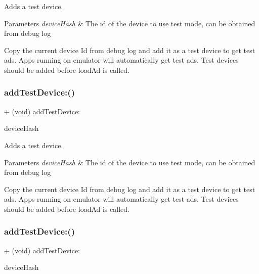 Adds a test device.


\begin{DoxyParams}{Parameters}
{\em device\+Hash} & The id of the device to use test mode, can be obtained from debug log\\
\hline
\end{DoxyParams}
Copy the current device Id from debug log and add it as a test device to get test ads. Apps running on emulator will automatically get test ads. Test devices should be added before load\+Ad is called. \mbox{\label{interfaceFBAdSettings_adf2fc44110adb3613551750bf42671af}} 
\subsubsection{\texorpdfstring{add\+Test\+Device\+:()}{addTestDevice:()}\hspace{0.1cm}{\footnotesize\ttfamily [2/5]}}
{\footnotesize\ttfamily + (void) add\+Test\+Device\+: \begin{DoxyParamCaption}\item[{(N\+S\+String $\ast$)}]{device\+Hash }\end{DoxyParamCaption}}

Adds a test device.


\begin{DoxyParams}{Parameters}
{\em device\+Hash} & The id of the device to use test mode, can be obtained from debug log\\
\hline
\end{DoxyParams}
Copy the current device Id from debug log and add it as a test device to get test ads. Apps running on emulator will automatically get test ads. Test devices should be added before load\+Ad is called. \mbox{\label{interfaceFBAdSettings_adf2fc44110adb3613551750bf42671af}} 
\subsubsection{\texorpdfstring{add\+Test\+Device\+:()}{addTestDevice:()}\hspace{0.1cm}{\footnotesize\ttfamily [3/5]}}
{\footnotesize\ttfamily + (void) add\+Test\+Device\+: \begin{DoxyParamCaption}\item[{(N\+S\+String $\ast$)}]{device\+Hash }\end{DoxyParamCaption}}

